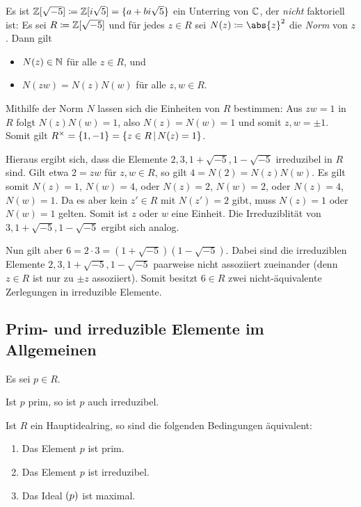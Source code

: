 \begin{example}
  Es ist $\mathbb{Z}[\sqrt{-5}] \coloneqq \mathbb{Z}[i\sqrt{5}] = \{a + bi\sqrt{5}\}$ ein Unterring von $\mathbb{C}$, der \emph{nicht} faktoriell ist:
  Es sei $R \coloneqq \mathbb{Z}[\sqrt{-5}]$ und für jedes $z \in R$ sei $N(z) \defined \abs{z}^2$ die \emph{Norm} von $z$.
  Dann gilt
  \begin{itemize}
    \item
      $N(z) \in \mathbb{N}$ für alle $z \in R$, und
    \item
      $N(zw) = N(z) N(w)$ für alle $z, w \in R$.
  \end{itemize}
  
  Mithilfe der Norm $N$ lassen sich die Einheiten von $R$ bestimmen:
  Aus $zw = 1$ in $R$ folgt $N(z)N(w) = 1$, also $N(z) = N(w) = 1$ und somit $z, w = \pm 1$.
  Somit gilt $\unitgroup{R} = \{1, -1\} = \{z \in R \suchthat N(z) = 1\}$.
  
  Hieraus ergibt sich, dass die Elemente $2, 3, 1 + \sqrt{-5}, 1 - \sqrt{-5}$ irreduzibel in $R$ sind.
  Gilt etwa $2 = zw$ für $z,w \in R$, so gilt $4 = N(2) = N(z)N(w)$.
  Es gilt somit $N(z) = 1$, $N(w) = 4$, oder $N(z) = 2$, $N(w) = 2$, oder $N(z) = 4$, $N(w) = 1$.
  Da es aber kein $z' \in R$ mit $N(z') = 2$ gibt, muss $N(z) = 1$ oder $N(w) = 1$ gelten.
  Somit ist $z$ oder $w$ eine Einheit.
  Die Irreduziblität von $3, 1 + \sqrt{-5}, 1 - \sqrt{-5}$ ergibt sich analog.
  
  Nun gilt aber $6 = 2 \cdot 3 = (1 + \sqrt{-5})(1 - \sqrt{-5})$.
  Dabei sind die irreduziblen Elemente $2, 3, 1 + \sqrt{-5}, 1 - \sqrt{-5}$ paarweise nicht assoziiert zueinander (denn $z \in R$ ist nur zu $\pm z$ assoziiert).
  Somit besitzt $6 \in R$ zwei nicht-äquivalente Zerlegungen in irreduzible Elemente.
\end{example}




\subsection{Prim- und irreduzible Elemente im Allgemeinen}

Es sei $p \in R$.

\begin{lemma}
  Ist $p$ prim, so ist $p$ auch irreduzibel.
\end{lemma}

\begin{lemma}
  Ist $R$ ein Hauptidealring, so sind die folgenden Bedingungen äquivalent:
  \begin{enumerate}
    \item
      Das Element $p$ ist prim.
    \item
      Das Element $p$ ist irreduzibel.
    \item
      Das Ideal $(p)$ ist maximal.
  \end{enumerate}
\end{lemma}

